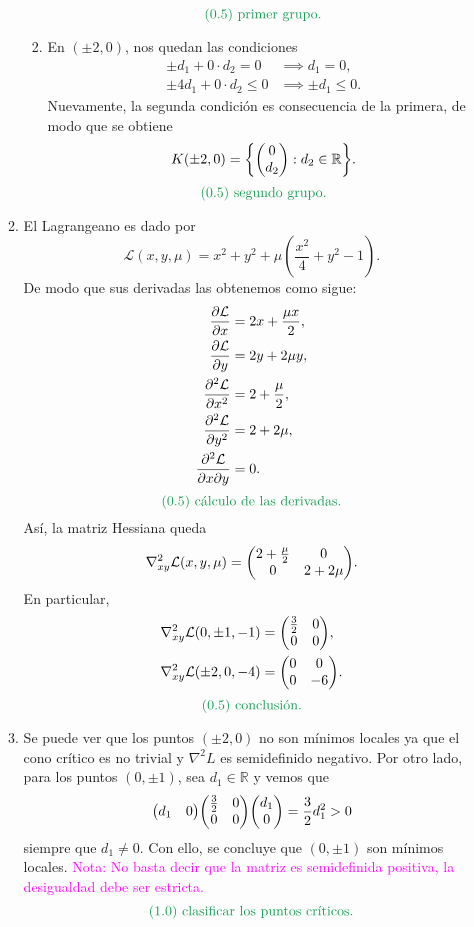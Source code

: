 \documentclass{article}
\begin{document}
\begin{enumerate}
\begin{enumerate}
\begin{enumerate}
\[				\]
				\[
					\text{\textcolor{ForestGreen}{(0.5) primer grupo.}}
				\]
			\item En \((\pm 2, 0)\), nos quedan las condiciones
				\begin{align*}
					\pm d_1 + 0 \cdot d_2 = 0 &\implies d_1 = 0, \\
					\pm 4d_1 + 0 \cdot d_2 \leq 0 &\implies \pm d_1 \leq 0.
				\end{align*}
				Nuevamente, la segunda condición es consecuencia de la primera, de modo que se obtiene
				\[
					K(\pm 2, 0) = \qty{\mqty(0 \\ d_2) : d_2 \in \mathbb{R}}.
				\]
				\[
					\text{\textcolor{ForestGreen}{(0.5) segundo grupo.}}
				\]
		\end{enumerate}
	\item El Lagrangeano es dado por
		\[
			\mathcal{L}(x, y, \mu) = x^2 + y^2 + \mu \left(\frac{x^2}{4} + y^2 - 1\right).
		\]
		De modo que sus derivadas las obtenemos como sigue:
		\begin{align*}
			\pdv{\mathcal{L}}{x} &= 2x + \frac{\mu x}{2}, \\
			\pdv{\mathcal{L}}{y} &= 2y + 2\mu y, \\
			\pdv[2]{\mathcal{L}}{x} &= 2 + \frac{\mu}{2}, \\
			\pdv[2]{\mathcal{L}}{y} &= 2 + 2\mu, \\
			\frac{\partial^2 \mathcal{L}}{\partial x \partial y} &= 0.
		\end{align*}
		\[
			\text{\textcolor{ForestGreen}{(0.5) cálculo de las derivadas.}}
		\]
		Así, la matriz Hessiana queda
		\[
			\nabla^2_{xy}\mathcal{L}(x, y, \mu) = \mqty(2 + \frac{\mu}{2} & 0 \\ 0 & 2 + 2\mu).
		\]
		En particular,
		\begin{align*}
			\nabla^2_{xy}\mathcal{L}(0, \pm 1, -1) &= \mqty(\frac{3}{2} & 0 \\ 0 & 0), \\
			\nabla^2_{xy}\mathcal{L}(\pm 2, 0, -4) &= \mqty(0 & 0 \\ 0 & -6).
		\end{align*}
		\[
			\text{\textcolor{ForestGreen}{(0.5) conclusión.}}
		\]
	\item Se puede ver que los puntos \((\pm 2, 0)\) no son mínimos locales ya que el cono crítico es no trivial y \(\nabla^2 L\) es semidefinido negativo. Por otro lado, para los puntos \((0, \pm 1)\), sea \(d_1 \in \mathbb{R}\) y vemos que
		\[
			\mqty(d_1 & 0) \mqty(\frac{3}{2} & 0 \\ 0 & 0) \mqty(d_1 \\ 0) = \frac{3}{2} d_1^2 > 0
		\]
		siempre que \(d_1 \neq 0\). Con ello, se concluye que \((0, \pm 1)\) son mínimos locales. \textcolor{magenta}{Nota: No basta decir que la matriz es semidefinida positiva, la desigualdad debe ser estricta.}
		\[
			\text{\textcolor{ForestGreen}{(1.0) clasificar los puntos críticos.}}
		\]


\end{enumerate}
\end{enumerate}
\end{document}
